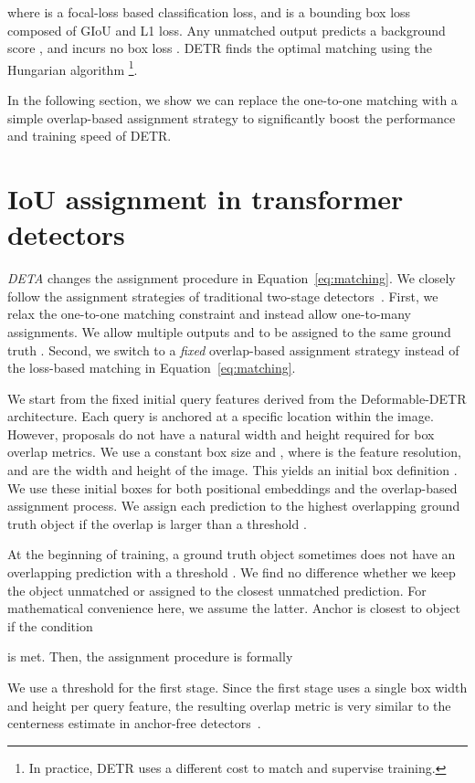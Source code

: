 \documentclass[10pt,twocolumn,letterpaper]{article}
\newcommand{\myparagraph}[1]{\vspace{2pt}\noindent{\textbf{#1}}}
\newcommand{\refeq}[1]{Equation~\eqref{eq:#1}}
\def\name{{\textit{DETA}}\xspace}
\begin{document}
where  is a focal-loss based classification loss, and  is a bounding box loss composed of GIoU and L1 loss. 
Any unmatched output  predicts a background score , and incurs no box loss .
DETR finds the optimal matching  using the Hungarian algorithm
\footnote{In practice, DETR uses a different cost to match and supervise training.}.



In the following section, we show we can replace the one-to-one matching with a simple overlap-based assignment strategy to significantly boost the performance and training speed of DETR.


\section{IoU assignment in transformer detectors}

\name changes the assignment procedure in \refeq{matching}.
We closely follow the assignment strategies of traditional two-stage detectors~\cite{ren2015faster}.
First, we relax the one-to-one matching constraint and instead allow one-to-many assignments.
We allow multiple outputs  and  to be assigned to the same ground truth .
Second, we switch to a \emph{fixed} overlap-based assignment strategy instead of the loss-based matching in \refeq{matching}.

\myparagraph{First stage assignments.}
We start from the fixed initial query features  derived from the Deformable-DETR architecture.
Each query  is anchored at a specific location  within the image.
However, proposals do not have a natural width and height required for box overlap metrics.
We use a constant box size  and , where  is the feature resolution,  and  are the width and height of the image.
This yields an initial box definition .
We use these initial boxes for both positional embeddings and the overlap-based assignment process.
We assign each prediction  to the highest overlapping ground truth object if the overlap is larger than a threshold .

At the beginning of training, a ground truth object sometimes does not have an overlapping prediction with a threshold .
We find no difference whether we keep the object unmatched or assigned to the closest unmatched prediction.
For mathematical convenience here, we assume the latter.
Anchor  is closest to object  if the condition

is met. Then, the assignment procedure is formally

We use a threshold  for the first stage.
Since the first stage uses a single box width and height per query feature, the resulting overlap metric  is very similar to the centerness estimate in anchor-free detectors~\cite{zhou2021probablistic,tian2019fcos,zhou2019objects}.
\end{document}
